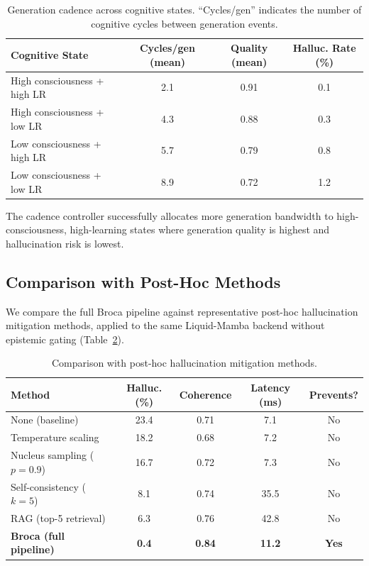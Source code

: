 \documentclass[12pt,a4paper]{article}
\begin{document}
\begin{table}[H]
\centering
\caption{Generation cadence across cognitive states. ``Cycles/gen'' indicates the number of cognitive cycles between generation events.}
\label{tab:cadence}
\begin{tabular}{lccc}
\toprule
\textbf{Cognitive State} & \textbf{Cycles/gen (mean)} & \textbf{Quality (mean)} & \textbf{Halluc. Rate (\%)} \\
\midrule
High consciousness + high LR & 2.1 & 0.91 & 0.1 \\
High consciousness + low LR & 4.3 & 0.88 & 0.3 \\
Low consciousness + high LR & 5.7 & 0.79 & 0.8 \\
Low consciousness + low LR & 8.9 & 0.72 & 1.2 \\
\bottomrule
\end{tabular}
\end{table}

The cadence controller successfully allocates more generation bandwidth to high-consciousness, high-learning states where generation quality is highest and hallucination risk is lowest.

\subsection{Comparison with Post-Hoc Methods}

We compare the full Broca pipeline against representative post-hoc hallucination mitigation methods, applied to the same Liquid-Mamba backend without epistemic gating (Table~\ref{tab:comparison}).

\begin{table}[H]
\centering
\caption{Comparison with post-hoc hallucination mitigation methods.}
\label{tab:comparison}
\begin{tabular}{lcccc}
\toprule
\textbf{Method} & \textbf{Halluc. (\%)} & \textbf{Coherence} & \textbf{Latency (ms)} & \textbf{Prevents?} \\
\midrule
None (baseline) & 23.4 & 0.71 & 7.1 & No \\
Temperature scaling & 18.2 & 0.68 & 7.2 & No \\
Nucleus sampling ($p=0.9$) & 16.7 & 0.72 & 7.3 & No \\
Self-consistency ($k=5$) & 8.1 & 0.74 & 35.5 & No \\
RAG (top-5 retrieval) & 6.3 & 0.76 & 42.8 & No \\
\midrule
\textbf{Broca (full pipeline)} & \textbf{0.4} & \textbf{0.84} & \textbf{11.2} & \textbf{Yes} \\
\bottomrule
\end{tabular}
\end{table}
\end{document}
